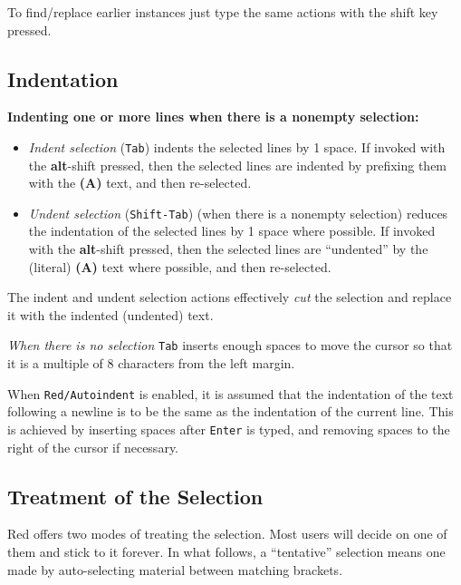 \documentclass[12pt,a4paper]{article}
\begin{document}
To find/replace earlier instances just type the same actions with the
shift key pressed.

\hypertarget{indentation}{%
\subsection{Indentation}\label{indentation}}

\textbf{Indenting one or more lines when there is a nonempty selection:}

\begin{itemize}
\item
  \emph{Indent selection} (\texttt{Tab}) indents the selected lines by 1
  space. If invoked with the \textbf{alt}-shift pressed, then the
  selected lines are indented by prefixing them with the \textbf{(A)}
  text, and then re-selected.
\item
  \emph{Undent selection} (\texttt{Shift-Tab}) (when there is a nonempty
  selection) reduces the indentation of the selected lines by 1 space
  where possible. If invoked with the \textbf{alt}-shift pressed, then
  the selected lines are ``undented'' by the (literal) \textbf{(A)} text
  where possible, and then re-selected.
\end{itemize}

The indent and undent selection actions effectively \emph{cut} the
selection and replace it with the indented (undented) text.

\emph{When there is no selection} \texttt{Tab} inserts enough spaces to
move the cursor so that it is a multiple of 8 characters from the left
margin.

When \texttt{Red/Autoindent} is enabled, it is assumed that the
indentation of the text following a newline is to be the same as the
indentation of the current line. This is achieved by inserting spaces
after \texttt{Enter} is typed, and removing spaces to the right of the
cursor if necessary.

\hypertarget{treatment-of-the-selection}{%
\subsection{Treatment of the
Selection}\label{treatment-of-the-selection}}

Red offers two modes of treating the selection. Most users will decide
on one of them and stick to it forever. In what follows, a ``tentative''
selection means one made by auto-selecting material between matching
brackets.
\end{document}
